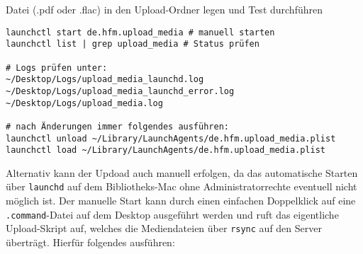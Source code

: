 \documentclass[12pt,a4paper]{report}
\begin{document}
\begin{enumerate}
    Datei (.pdf oder .flac) in den Upload-Ordner legen und Test durchführen

    \begin{verbatim}
launchctl start de.hfm.upload_media # manuell starten
launchctl list | grep upload_media # Status prüfen

# Logs prüfen unter:
~/Desktop/Logs/upload_media_launchd.log
~/Desktop/Logs/upload_media_launchd_error.log
~/Desktop/Logs/upload_media.log

# nach Änderungen immer folgendes ausführen:
launchctl unload ~/Library/LaunchAgents/de.hfm.upload_media.plist
launchctl load ~/Library/LaunchAgents/de.hfm.upload_media.plist
    \end{verbatim}
  \end{enumerate}

  Alternativ kann der Updoad auch manuell erfolgen, da das automatische Starten über \texttt{launchd} auf dem Bibliotheks-Mac ohne Administratorrechte eventuell nicht möglich ist.  
  Der manuelle Start kann durch einen einfachen Doppelklick auf eine \texttt{.command}-Datei auf dem Desktop ausgeführt werden und ruft das eigentliche Upload-Skript auf, 
  welches die Mediendateien über \texttt{rsync} auf den Server überträgt.
  Hierfür folgendes ausführen:
\end{document}
